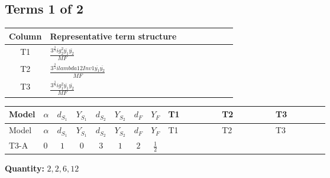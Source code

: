 \documentclass[8pt]{article}
\begin{document}
\begin{landscape}
\subsection*{Terms 1 of 2}
\begin{center}
\begin{tabular}{@{}c >{\raggedright\arraybackslash}p{0.82\linewidth}@{}}
\toprule
Column & Representative term structure \\
\midrule
T1 & \(\displaystyle \frac{3^{\frac{3}{4}} i g_{2}^{2} \overline{y_{1}} \overline{y_{2}}}{MF}\) \\
\midrule
T2 & \(\displaystyle \frac{3^{\frac{3}{4}} i lambda12Inv1 \overline{y_{1}} \overline{y_{2}}}{MF}\) \\
\midrule
T3 & \(\displaystyle \frac{3^{\frac{3}{4}} i g_{1}^{2} \overline{y_{1}} \overline{y_{2}}}{MF}\) \\
\midrule
\bottomrule
\end{tabular}
\end{center}
\smallskip
\tiny
\begin{longtable}{@{}llcccccc >{\raggedright\arraybackslash}p{0.21\linewidth} >{\raggedright\arraybackslash}p{0.21\linewidth} >{\raggedright\arraybackslash}p{0.21\linewidth}@{}}
\toprule
Model & $\alpha$ & $d_{S_1}$ & $Y_{S_1}$ & $d_{S_2}$ & $Y_{S_2}$ & $d_F$ & $Y_F$ & T1 & T2 & T3 \\
\midrule
\endfirsthead
\toprule
Model & $\alpha$ & $d_{S_1}$ & $Y_{S_1}$ & $d_{S_2}$ & $Y_{S_2}$ & $d_F$ & $Y_F$ & T1 & T2 & T3 \\
\midrule
\endhead
T3-A & $0$ & $1$ & $0$ & $3$ & $1$ & $2$ & $\frac{1}{2}$ & \scriptsize\adjustbox{max width=\linewidth}{$\begin{gathered} - \frac{11 \cdot 3^{\frac{3}{4}} i g_{2}^{2} \overline{y_{1}} \overline{y_{2}}}{8 MF}\end{gathered}$} & \scriptsize\adjustbox{max width=\linewidth}{$\begin{gathered} - \frac{3^{\frac{3}{4}} i lambda12Inv1 \overline{y_{1}} \overline{y_{2}}}{6 MF}\end{gathered}$} & \scriptsize\adjustbox{max width=\linewidth}{$\begin{gathered} - \frac{3^{\frac{3}{4}} i g_{1}^{2} \overline{y_{1}} \overline{y_{2}}}{8 MF}\end{gathered}$} \\
\midrule
\bottomrule
\end{longtable}
\clearpage
\noindent\textbf{Quantity: }$\mathrm{2,2,6,12}$\par\smallskip

\end{landscape}
\end{document}
